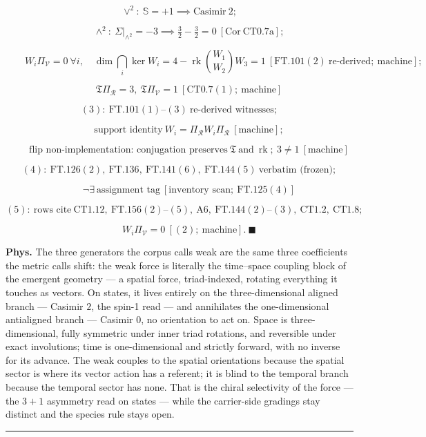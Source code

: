\begin{theorem}
\[
\vee^2:\ \mathbb S=+1\implies\text{Casimir}\ 2;
\]

\[
\qquad \wedge^2:\ \Sigma|_{\wedge^2}=-3\implies\tfrac32-\tfrac32=0\ [\mathrm{Cor}\ \mathrm{CT0.7a}];
\]

\[
\qquad W_i\Pi_{\mathcal V}=0\ \forall i,\quad\dim\bigcap_i\ker W_i=4-\operatorname{rk}\binom{W_1}{W_2}{W_3}=1\ [\mathrm{FT.101}(2)\ \text{re-derived};\ \text{machine}];
\]

\[
\qquad \mathfrak T\Pi_{\mathcal R}=3,\ \mathfrak T\Pi_{\mathcal V}=1\ [\mathrm{CT0.7}(1);\ \text{machine}]
\]

\[
(3):\ \mathrm{FT.101}(1)\text{–}(3)\ \text{re-derived witnesses};
\]

\[
\qquad \text{support identity}\ W_i=\Pi_{\mathcal R}W_i\Pi_{\mathcal R}\ [\text{machine}];
\]

\[
\qquad \text{flip non-implementation: conjugation preserves}\ \mathfrak T\ \text{and}\ \operatorname{rk};\ 3\ne1\ [\text{machine}]
\]

\[
(4):\ \mathrm{FT.126}(2),\ \mathrm{FT.136},\ \mathrm{FT.141}(6),\ \mathrm{FT.144}(5)\ \text{verbatim (frozen)};
\]

\[
\qquad \neg\exists\ \text{assignment tag}\ [\text{inventory scan};\ \mathrm{FT.125}(4)]
\]

\[
(5):\ \text{rows cite}\ \mathrm{CT1.12},\ \mathrm{FT.156}(2)\text{–}(5),\ \mathrm{A6},\ \mathrm{FT.144}(2)\text{–}(3),\ \mathrm{CT1.2},\ \mathrm{CT1.8};
\]

\[
\qquad W_i\Pi_{\mathcal V}=0\ [(2);\ \text{machine}].\ \blacksquare
\]

\textbf{Phys.} The three generators the corpus calls weak are the same three coefficients the metric calls shift: the weak force is literally the time–space coupling block of the emergent geometry — a spatial force, triad-indexed, rotating everything it touches as vectors. On states, it lives entirely on the three-dimensional aligned branch — Casimir $2$, the spin-1 read — and annihilates the one-dimensional antialigned branch — Casimir $0$, no orientation to act on. Space is three-dimensional, fully symmetric under inner triad rotations, and reversible under exact involutions; time is one-dimensional and strictly forward, with no inverse for its advance. The weak couples to the spatial orientations because the spatial sector is where its vector action has a referent; it is blind to the temporal branch because the temporal sector has none. That is the chiral selectivity of the force — the $3{+}1$ asymmetry read on states — while the carrier-side gradings stay distinct and the species rule stays open.

\vspace{2pt}\noindent\rule{\textwidth}{0.4pt}\vspace{2pt}

\end{theorem}

